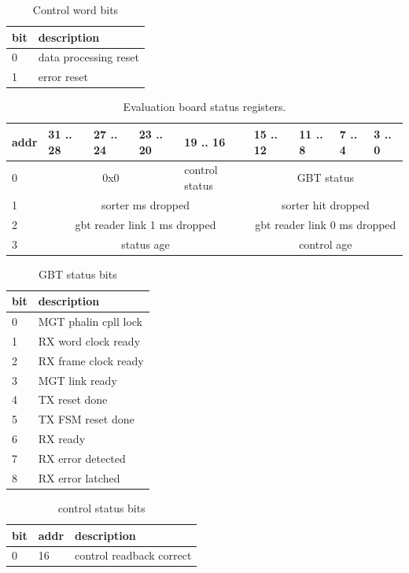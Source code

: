 \documentclass{article}
\begin{document}
\begin{table}[H]
\centering
\begin{tabular}{| l | l |}
\hline
bit & description \\ \hline
0 & data processing reset \\ \hline
1 & error reset \\ \hline
\end{tabular}
\caption{Control word bits\label{tab12}}
\end{table}



\begin{table}[H]
\centering
\begin{tabular}{| l | l | l | l | l | l | l | l | l |}
\hline
addr & 31 .. 28 & 27 .. 24 & 23 .. 20 & 19 .. 16 & 15 .. 12 & 11 .. 8 & 7 .. 4 & 3 .. 0 \\ \hline
0 & \multicolumn{3}{c|}{0x0} & control status  & \multicolumn{4}{c|}{GBT status} \\ \hline
1 & \multicolumn{4}{c|}{sorter ms dropped}  & \multicolumn{4}{c|}{sorter hit dropped} \\ \hline
2 & \multicolumn{4}{c|}{gbt reader link 1 ms dropped}  & \multicolumn{4}{c|}{gbt reader link 0 ms dropped} \\ \hline
3 & \multicolumn{4}{c|}{status age}& \multicolumn{4}{c|}{control age} \\ \hline

\end{tabular}
\caption{Evaluation board status registers.\label{tab13}}
\end{table}

\begin{table}[H]
\centering
\begin{tabular}{| l | l |}
\hline
bit & description \\ \hline
0 & MGT phalin cpll lock \\ \hline
1 & RX word clock ready \\ \hline
2 & RX frame clock ready \\ \hline
3 & MGT link ready \\ \hline
4 & TX reset done \\ \hline
5 & TX FSM reset done \\ \hline
6 & RX ready \\ \hline
7 & RX error detected \\ \hline
8 & RX error latched \\ \hline
\end{tabular}
\caption{GBT status bits\label{tab14}}
\end{table}


\begin{table}[H]
\centering
\begin{tabular}{| l | l | l |}
\hline
bit & addr & description \\ \hline
0 & 16 & control readback correct \\ \hline

\end{tabular}
\caption{control status bits\label{tab14}}
\end{table}
\end{document}
